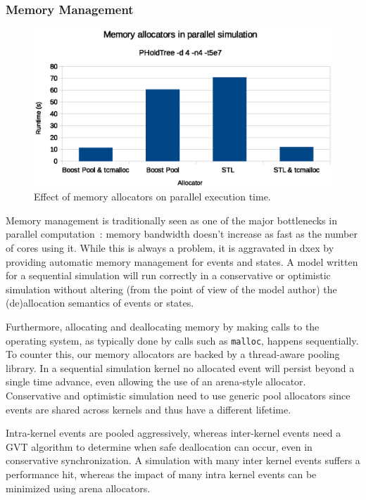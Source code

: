\subsubsection{Memory Management}
\label{sec:4-subsec:overhead-pgraph:memory}
\begin{figure}
    \center
    \includegraphics[width=\columnwidth]{fig/memory_allocators_parallel.eps}
    \caption{Effect of memory allocators on parallel execution time.}
    \label{fig:memallocators_parallel}
\end{figure}
Memory management is traditionally seen as one of the major bottlenecks in parallel computation~\cite{Memory}: memory bandwidth doesn't increase as fast as the number of cores using it.
While this is always a problem, it is aggravated in dxex by providing automatic memory management for events and states.
A model written for a sequential simulation will run correctly in a conservative or optimistic simulation without altering (from the point of view of the model author) the (de)allocation semantics of events or states.

Furthermore, allocating and deallocating memory by making calls to the operating system, as typically done by calls such as \texttt{malloc}, happens sequentially.
To counter this, our memory allocators are backed by a thread-aware pooling library.
In a sequential simulation kernel no allocated event will persist beyond a single time advance, even allowing the use of an arena-style allocator.
Conservative and optimistic simulation need to use generic pool allocators since events are shared across kernels and thus have a different lifetime.

Intra-kernel events are pooled aggressively, whereas inter-kernel events need a GVT algorithm to determine when safe deallocation can occur, even in conservative synchronization.
A simulation with many inter kernel events suffers a performance hit, whereas the impact of many intra kernel events can be minimized using arena allocators.

